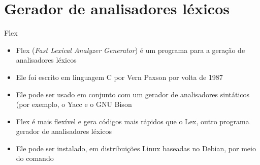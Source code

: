 \section{Gerador de analisadores léxicos}

\begin{frame}[fragile]{Flex}

    \begin{itemize}
        \item Flex (\textit{Fast Lexical Analyzer Generator}) é um programa para a geração de analisadores léxicos

        \item Ele foi escrito em linguagem C por Vern Paxson por volta de 1987

        \item Ele pode ser usado em conjunto com um gerador de analisadores sintáticos (por exemplo, o Yacc e o GNU Bison

        \item Flex é mais flexível e gera códigos mais rápidos que o Lex, outro programa gerador de analisadores léxicos

        \item Ele pode ser instalado, em distribuições Linux baseadas no Debian, por meio do comando
    \end{itemize}

\end{frame}

